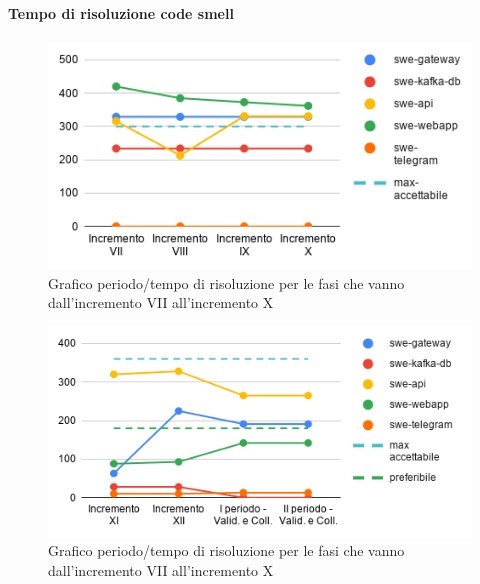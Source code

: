 \paragraph{Tempo di risoluzione code smell}
	\begin{figure}[H]
			\centering
			\includegraphics[width=0.8\linewidth]{./res/images/QM-PROD-14-TCS.png}
			\caption{Grafico periodo/tempo di risoluzione per le fasi che vanno dall'incremento VII all'incremento X}
			\label{fig:Grafico periodo/tempo di risoluzione per le fasi che vanno dall'incremento VII all'incremento X}
	\end{figure}
	\begin{figure}[H]
			\centering
			\includegraphics[width=0.8\linewidth]{./res/images/QM-PROD-14-TCS_1.png}
			\caption{Grafico periodo/tempo di risoluzione per le fasi che vanno dall'incremento VII all'incremento X}
			\label{fig:Grafico periodo/tempo di risoluzione per le fasi che vanno dall'incremento XI alla fase di validazione e collaudo}
	\end{figure}

